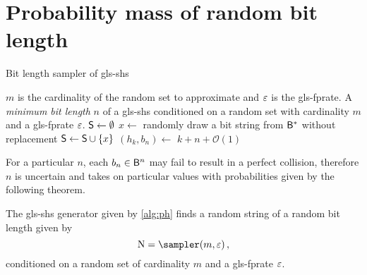 \documentclass[ ../main.tex]{subfiles}
\begin{document}
\appendix
\appendixpage
\addappheadtotoc
\section{Probability mass of random bit length}
\begin{algorithm}
    \caption{Bit length sampler of \gls*{gls-shs}}
    \label{alg:sampler}
    \KwIn
    {
        $m$ is the cardinality of the random set to approximate and $\varepsilon$ is the \gls{gls-fprate}.
    }
    \KwOut
    {
        A \emph{minimum bit length} $n$ of a \gls{gls-shs} conditioned on a random set with cardinality $m$ and a \gls{gls-fprate} $\varepsilon$.
    }
    {
        $\Set{S} \gets \emptyset$\;
        {
            $x \gets $ randomly draw a bit string from $\Set{B}^{*}$ without replacement\;
            $\Set{S} \gets \Set{S} \cup \{x\}$\;
        }    
        $(h_k,b_n) \gets$ \;
        \Return $k + n + \mathcal{O}(1)$\;
    }
\end{algorithm}

For a particular $n$, each $b_n \in \Set{B}^n$ may fail to result in a perfect collision, therefore $n$ is uncertain and takes on particular values with probabilities given by the following theorem.
\begin{definition}
\label{thm:N_pmf}
The \gls{gls-shs} generator given by \cref{alg:ph} finds a random string of a random bit length given by
\begin{equation}
    \RV{N} = \sampler(m, \fprate)\,,
\end{equation}
conditioned on a random set of cardinality $m$ and a \gls{gls-fprate} $\varepsilon$.
\end{definition}
\end{document}
